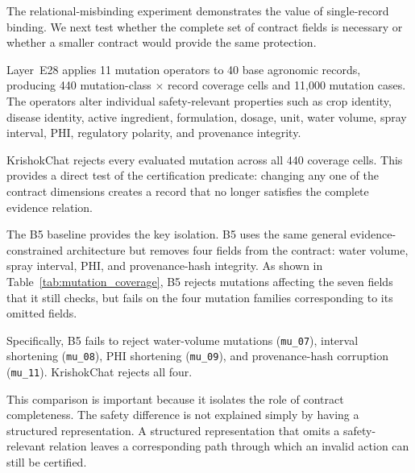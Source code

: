 \documentclass[a4paper,fleqn]{cas-dc}
\begin{document}
The relational-misbinding experiment demonstrates the value of single-record binding. We next test whether the complete set of contract fields is necessary or whether a smaller contract would provide the same protection.

Layer~E28 applies 11 mutation operators to 40 base agronomic records, producing 440 mutation-class $\times$ record coverage cells and 11{,}000 mutation cases. The operators alter individual safety-relevant properties such as crop identity, disease identity, active ingredient, formulation, dosage, unit, water volume, spray interval, PHI, regulatory polarity, and provenance integrity.

KrishokChat rejects every evaluated mutation across all 440 coverage cells. This provides a direct test of the certification predicate: changing any one of the contract dimensions creates a record that no longer satisfies the complete evidence relation.

The B5 baseline provides the key isolation. B5 uses the same general evidence-constrained architecture but removes four fields from the contract: water volume, spray interval, PHI, and provenance-hash integrity. As shown in Table~\ref{tab:mutation_coverage}, B5 rejects mutations affecting the seven fields that it still checks, but fails on the four mutation families corresponding to its omitted fields.

Specifically, B5 fails to reject water-volume mutations (\texttt{mu\_07}), interval shortening (\texttt{mu\_08}), PHI shortening (\texttt{mu\_09}), and provenance-hash corruption (\texttt{mu\_11}). KrishokChat rejects all four.

This comparison is important because it isolates the role of contract completeness. The safety difference is not explained simply by having a structured representation. A structured representation that omits a safety-relevant relation leaves a corresponding path through which an invalid action can still be certified.
\end{document}
